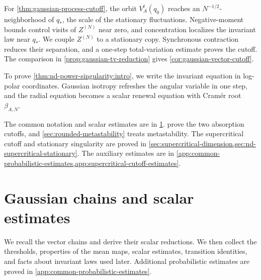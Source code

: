 \documentclass[11pt,reqno,a4paper]{article}
\begin{document}
For \cref{thm:gaussian-process-cutoff}, the orbit $V_A^t(q_0)$ reaches an
$N^{-1/2}$-neighborhood of $q_\ast$, the scale of the stationary fluctuations.
Negative-moment bounds control visits of $Z^{(N)}$ near zero, and concentration
localizes the invariant law near $q_\ast$. We couple $Z^{(N)}$ to a stationary
copy. Synchronous contraction reduces their separation, and a one-step
total-variation estimate proves the cutoff. The comparison in
\cref{prop:gaussian-tv-reduction} gives \cref{cor:gaussian-vector-cutoff}.

To prove \cref{thm:nd-power-singularity:intro}, we write the invariant equation
in log-polar coordinates. Gaussian isotropy refreshes the angular variable in
one step, and the radial equation becomes a scalar renewal equation with
Cramér root $\beta_{A,N}$.

The common notation and scalar estimates are in \cref{sec:setup}.
prove the two absorption cutoffs, and \cref{sec:rounded-metastability} treats
metastability. The supercritical cutoff and stationary singularity are
proved in \cref{sec:supercritical-dimension,sec:nd-supercritical-stationary}.
The auxiliary estimates are in
\cref{app:common-probabilistic-estimates,app:supercritical-cutoff-estimates}.

\section{Gaussian chains and scalar estimates}
\label{sec:setup}

We recall the vector chains and derive their scalar reductions. We then collect
the thresholds, properties of the mean maps, scalar estimates, transition
identities, and facts about invariant laws used later. Additional probabilistic
estimates are proved in
\cref{app:common-probabilistic-estimates}.
\end{document}
